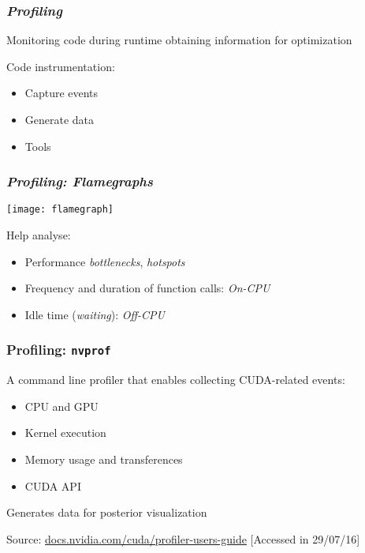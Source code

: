 \documentclass[10pt, compress]{beamer}
\begin{document}
\begin{frame}
    \frametitle{\textit{Profiling}}
    Monitoring code during \alert{runtime}
    obtaining information for \alert{optimization}
    \pause

    Code \alert{instrumentation}:
    \begin{itemize}
        \item Capture \alert{events}
            \pause
        \item Generate \alert{data}
            \pause
        \item Tools
    \end{itemize}
\end{frame}

\begin{frame}
    \frametitle{\textit{Profiling: Flamegraphs}}
    \begin{center}
        \texttt{[image: flamegraph]}
    \end{center}

    Help analyse:
    \begin{itemize}
        \item Performance \textit{bottlenecks}, \textit{hotspots}
            \pause
        \item Frequency and duration of \alert{function calls}: \textit{On-CPU}
            \pause
        \item \alert{Idle} time (\textit{waiting}): \textit{Off-CPU}
    \end{itemize}
\end{frame}

\begin{frame}
    \frametitle{Profiling: \texttt{nvprof}}
    A \alert{command line} profiler
    that enables collecting CUDA-related events:
    \pause
    \begin{itemize}
        \item CPU and GPU
            \pause
        \item Kernel execution
            \pause
        \item Memory usage and transferences
            \pause
        \item CUDA API
    \end{itemize}
    \pause

    Generates data for \alert{posterior visualization}

    \begin{center}
        \tiny{Source: \url{docs.nvidia.com/cuda/profiler-users-guide} [Accessed in 29/07/16]}
    \end{center}
\end{frame}
\end{document}
